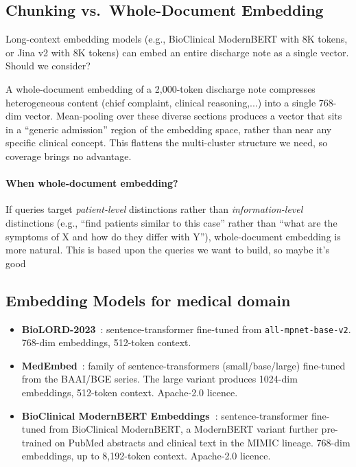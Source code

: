 \documentclass[11pt,a4paper]{article}
\begin{document}
\subsection{Chunking vs.\ Whole-Document Embedding}

Long-context embedding models (e.g., BioClinical ModernBERT with 8K tokens, or Jina v2 with 8K tokens) can embed an entire discharge note as a single vector.  Should we consider?

A whole-document embedding of a 2{,}000-token discharge note compresses heterogeneous content (chief complaint, clinical reasoning,...) into a single 768-dim vector.  Mean-pooling over these diverse sections produces a vector that sits in a ``generic admission'' region of the embedding space, rather than near any specific clinical concept.  This flattens the multi-cluster structure we need, so coverage brings no advantage.

\paragraph{When whole-document embedding?}
If queries target \emph{patient-level} distinctions rather than \emph{information-level} distinctions (e.g., ``find patients similar to this case'' rather than ``what are the symptoms of X and how do they differ with Y''), whole-document embedding is more natural.  This is based upon the queries we want to build, so maybe it's good

\subsection{Embedding Models for medical domain}
\label{sec:embeddings}

\begin{itemize}[itemsep=4pt, parsep=1pt]

	\item \textbf{BioLORD-2023}~\cite{biolord}: sentence-transformer fine-tuned from \texttt{all-mpnet-base-v2}. 768-dim embeddings, 512-token context.

	\item \textbf{MedEmbed}~\cite{medembed}: family of sentence-transformers (small/base/large) fine-tuned from the BAAI/BGE series. The large variant produces 1024-dim embeddings, 512-token context.  Apache-2.0 licence.
	      \
	\item \textbf{BioClinical ModernBERT Embeddings~\cite{sounack2025bioclinical}}: sentence-transformer fine-tuned from BioClinical ModernBERT, a ModernBERT variant further pre-trained on PubMed abstracts and clinical text in the MIMIC lineage.  768-dim embeddings, up to 8{,}192-token context. Apache-2.0 licence.

\end{itemize}
\end{document}
